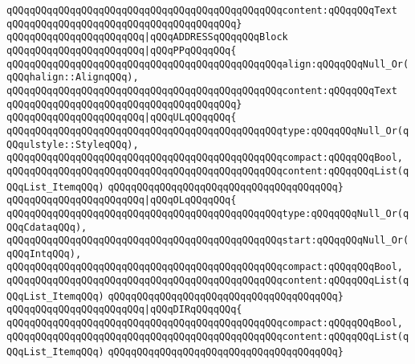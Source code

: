 \verb|qQQqqQQqqQQqqQQqqQQqqQQqqQQqqQQqqQQqqQQqqQQqqQQqcontent:qQQqqQQqText|\newline
\verb|qQQqqQQqqQQqqQQqqQQqqQQqqQQqqQQqqQQqqQQq}|\newline
\verb|qQQqqQQqqQQqqQQqqQQqqQQq|\verb#|qQQqADDRESSqQQqqQQqBlock#\newline
\verb|qQQqqQQqqQQqqQQqqQQqqQQq|\verb#|qQQqPPqQQqqQQq{#\newline
\verb|qQQqqQQqqQQqqQQqqQQqqQQqqQQqqQQqqQQqqQQqqQQqqQQqalign:qQQqqQQqNull_Or(qQQqhalign::AlignqQQq),|\newline
\verb|qQQqqQQqqQQqqQQqqQQqqQQqqQQqqQQqqQQqqQQqqQQqqQQqcontent:qQQqqQQqText|\newline
\verb|qQQqqQQqqQQqqQQqqQQqqQQqqQQqqQQqqQQqqQQq}|\newline
\verb|qQQqqQQqqQQqqQQqqQQqqQQq|\verb#|qQQqULqQQqqQQq{#\newline
\verb|qQQqqQQqqQQqqQQqqQQqqQQqqQQqqQQqqQQqqQQqqQQqqQQqtype:qQQqqQQqNull_Or(qQQqulstyle::StyleqQQq),|\newline
\verb|qQQqqQQqqQQqqQQqqQQqqQQqqQQqqQQqqQQqqQQqqQQqqQQqcompact:qQQqqQQqBool,|\newline
\verb|qQQqqQQqqQQqqQQqqQQqqQQqqQQqqQQqqQQqqQQqqQQqqQQqcontent:qQQqqQQqList(qQQqList_ItemqQQq)|\newline
\verb|qQQqqQQqqQQqqQQqqQQqqQQqqQQqqQQqqQQqqQQq}|\newline
\verb|qQQqqQQqqQQqqQQqqQQqqQQq|\verb#|qQQqOLqQQqqQQq{#\newline
\verb|qQQqqQQqqQQqqQQqqQQqqQQqqQQqqQQqqQQqqQQqqQQqqQQqtype:qQQqqQQqNull_Or(qQQqCdataqQQq),|\newline
\verb|qQQqqQQqqQQqqQQqqQQqqQQqqQQqqQQqqQQqqQQqqQQqqQQqstart:qQQqqQQqNull_Or(qQQqIntqQQq),|\newline
\verb|qQQqqQQqqQQqqQQqqQQqqQQqqQQqqQQqqQQqqQQqqQQqqQQqcompact:qQQqqQQqBool,|\newline
\verb|qQQqqQQqqQQqqQQqqQQqqQQqqQQqqQQqqQQqqQQqqQQqqQQqcontent:qQQqqQQqList(qQQqList_ItemqQQq)|\newline
\verb|qQQqqQQqqQQqqQQqqQQqqQQqqQQqqQQqqQQqqQQq}|\newline
\verb|qQQqqQQqqQQqqQQqqQQqqQQq|\verb#|qQQqDIRqQQqqQQq{#\newline
\verb|qQQqqQQqqQQqqQQqqQQqqQQqqQQqqQQqqQQqqQQqqQQqqQQqcompact:qQQqqQQqBool,|\newline
\verb|qQQqqQQqqQQqqQQqqQQqqQQqqQQqqQQqqQQqqQQqqQQqqQQqcontent:qQQqqQQqList(qQQqList_ItemqQQq)|\newline
\verb|qQQqqQQqqQQqqQQqqQQqqQQqqQQqqQQqqQQqqQQq}|\newline
